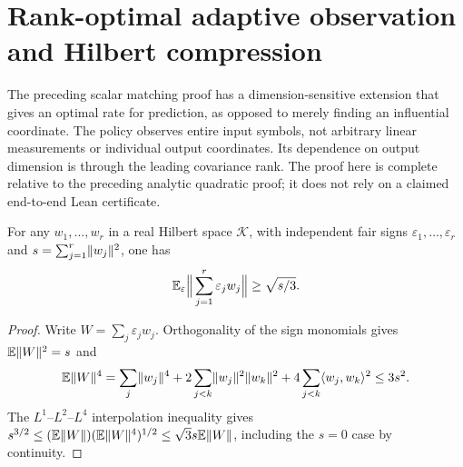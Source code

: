 \section{Rank-optimal adaptive observation and Hilbert compression}\label{sec:rank-observation}
The preceding scalar matching proof has a dimension-sensitive extension that gives an optimal rate for prediction, as opposed to merely finding an influential coordinate. The policy observes entire input symbols, not arbitrary linear measurements or individual output coordinates. Its dependence on output dimension is through the leading covariance rank. The proof here is complete relative to the preceding analytic quadratic proof; it does not rely on a claimed end-to-end Lean certificate.

\begin{lemma}\label{lem:signhilbert}
For any $w_1,\ldots,w_r$ in a real Hilbert space $\mathcal K$, with independent fair signs $\varepsilon_1,\ldots,\varepsilon_r$ and $s=\sum_{j=1}^r\lVert w_j\rVert^2$, one has
\[
 \mathbb E_\varepsilon\Big\|\sum_{j=1}^r\varepsilon_jw_j\Big\|\ge\sqrt{s/3}.
\]
\end{lemma}
\begin{proof}
Write $W=\sum_j\varepsilon_jw_j$. Orthogonality of the sign monomials gives $\mathbb E\lVert W\rVert^2=s$ and
\[
 \mathbb E\lVert W\rVert^4
 =\sum_j\lVert w_j\rVert^4+2\sum_{j<k}\lVert w_j\rVert^2\lVert w_k\rVert^2
   +4\sum_{j<k}\langle w_j,w_k\rangle^2\le3s^2.
\]
The $L^1$--$L^2$--$L^4$ interpolation inequality gives
$s^{3/2}\le(\mathbb E\lVert W\rVert)(\mathbb E\lVert W\rVert^4)^{1/2}\le\sqrt3s\mathbb E\lVert W\rVert$, including the $s=0$ case by continuity.
\end{proof}


